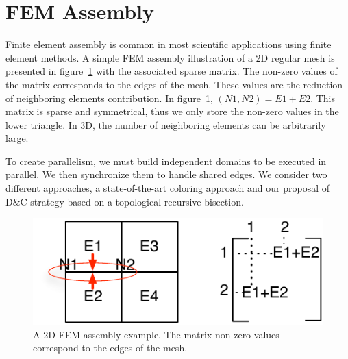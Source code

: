 \documentclass[10pt]{IOS-Book-Article}
\begin{document}
\section{FEM Assembly}

Finite element assembly is common in most scientific applications using finite element methods.
A simple FEM assembly illustration of a 2D regular mesh is presented in figure~\ref{fig:2Dasm} with the associated sparse matrix.
The non-zero values of the matrix corresponds to the edges of the mesh. These values are the reduction of neighboring elements contribution. In figure~\ref{fig:2Dasm}, $(N1,N2) = E1 + E2$.
This matrix is sparse and symmetrical, thus we only store the non-zero values in the lower triangle.
In 3D, the number of neighboring elements can be arbitrarily large.

To create parallelism, we must build independent domains to be executed in parallel. We then synchronize them to handle shared edges.
We consider two different approaches, a state-of-the-art coloring approach and our proposal of D\&C strategy based on a topological recursive bisection.

\begin{figure}[htp]
 \includegraphics[scale=0.6]{FEM_ass.pdf}
 \caption{A 2D FEM assembly example. The matrix non-zero values correspond to the edges of the mesh.}
 \label{fig:2Dasm}
\end{figure}
\end{document}
